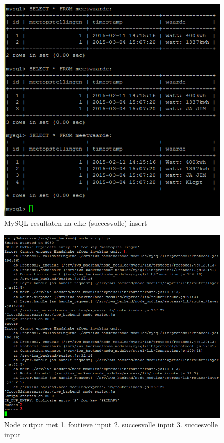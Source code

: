 \documentclass[12pt]{article}
\begin{document}
\begin{figure}
\begin{center}
\includegraphics[scale=1]{Rest_test_1.png}
\caption{MySQL resultaten na elke (succesvolle) insert}
\label{fig:rest_test1}
\end{center}
\end{figure}
\begin{figure}
\begin{center}
\includegraphics[scale=.9]{Rest_test_2.png}
\caption{Node output met 1. foutieve input 2. succesvolle input 3. succesvolle input}
\label{fig:rest_test2}
\end{center}
\end{figure}
\end{document}
